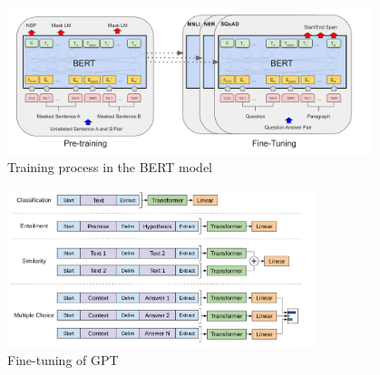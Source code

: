 \documentclass[runningheads]{llncs}
\begin{document}
 \begin{figure}[]
   \centering
   \includegraphics[width=0.95\textwidth]{BERT Finetuning.png}
   \caption{Training process in the BERT model \cite{Devlin18}}
   \label{fig:bert_finetune}
 \end{figure}
\begin{figure}[]
    \centering
    \includegraphics[width=0.8\textwidth]{gpt finetune.png}
    \caption{Fine-tuning of GPT \cite{Radford18}}
    \label{fig:gpt_finetune}
\end{figure}
\end{document}
